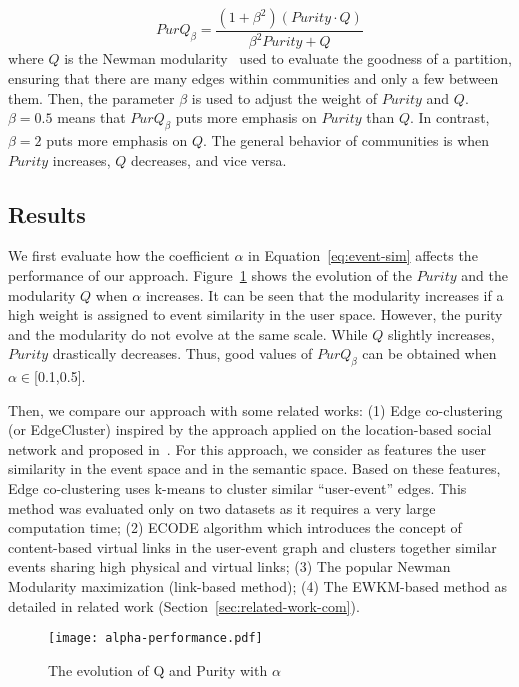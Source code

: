 \begin{equation}    \label{eq:purq}
	PurQ_\beta= \frac{(1+\beta^2) (Purity \cdot Q )}{\beta^2 Purity + Q}			
\end{equation}
where $Q$ is the Newman modularity~\cite{Newman:04} used to evaluate the goodness of a partition, ensuring that there are many edges within communities and only a few between them. Then, the parameter $\beta$ is used to adjust the weight of $Purity$ and $Q$. $\beta=0.5$ means that $PurQ_\beta$ puts more emphasis on $Purity$ than $Q$. In contrast, $\beta=2$ puts more emphasis on $Q$. The general behavior of communities is when $Purity$ increases, $Q$ decreases, and vice versa.



\subsection{Results} 
We first evaluate how the coefficient $\alpha$ in Equation~\ref{eq:event-sim} affects the performance of our approach. Figure~\ref{fig:alpha-impact} shows the evolution of the $Purity$ and the modularity $Q$ when $\alpha$ increases. It can be seen that the modularity increases if a high weight is assigned to event similarity in the user space. However, the purity and the modularity do not evolve at the same scale. While $Q$ slightly increases, $Purity$ drastically decreases. Thus, good values of $PurQ_\beta$ can be obtained when $\alpha \in $[0.1,0.5]. 

Then, we compare our approach with some related works: (1) Edge co-clustering (or EdgeCluster) inspired by the approach applied on the location-based social network and proposed in~\cite{Wang:14}. For this approach, we consider as features the user similarity in the event space and in the semantic space. Based on these features, Edge co-clustering uses k-means to cluster similar ``user-event'' edges. This method was evaluated only on two datasets as it requires a very large computation time; (2) ECODE algorithm which introduces the concept of content-based virtual links in the user-event graph and clusters together similar events sharing high physical and virtual links; (3) The popular Newman Modularity maximization (link-based method); (4) The EWKM-based method as detailed in related work (Section~\ref{sec:related-work-com}).

\begin{figure}[htpb]
  \centering
  \texttt{[image: alpha-performance.pdf]}
  \caption{The evolution of Q and Purity with $\alpha$}
  \label{fig:alpha-impact}
\end{figure}

